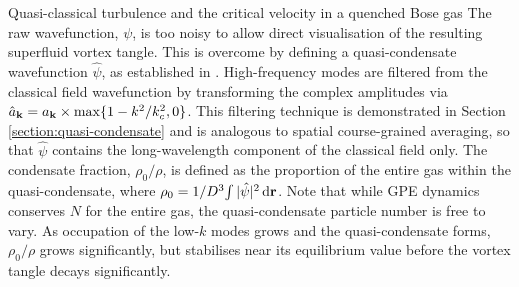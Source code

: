 \begin{chapter}{\label{cha:nonequib}Quasi-classical turbulence and the critical velocity in a quenched Bose gas}
The raw wavefunction, $\psi$, is too noisy to allow direct visualisation of the resulting superfluid vortex tangle. This is overcome by defining a quasi-condensate wavefunction $\hat{\psi}$, as established in \cite{PhysRevA.66.013603}. High-frequency modes are filtered from the classical field wavefunction by transforming the complex amplitudes via $\hat{a}_{{\bf k}} = a_{{\bf k}}\times\max\{1-k^{2}/k_c^2,0\}$. This filtering technique is demonstrated in Section \ref{section:quasi-condensate} and is analogous to spatial course-grained averaging, so that $\hat{\psi}$ contains the long-wavelength component of the classical field only.  The condensate fraction, $\rho_0/\rho$, is defined as the proportion of the entire gas within the quasi-condensate, where $\rho_0 = 1/D^3 \! \int |\hat\psi|^2\,{\rm d}{\bf r}$. Note that while GPE dynamics conserves $N$ for the entire gas, the quasi-condensate particle number is free to vary. As occupation of the low-$k$ modes grows and the quasi-condensate forms, $\rho_0/\rho$ grows significantly, but stabilises near its equilibrium value before the vortex tangle decays significantly. 


\end{chapter}
